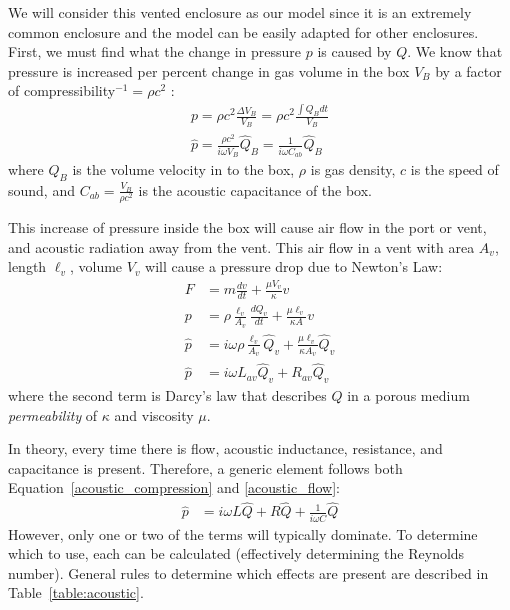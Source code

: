 \documentclass[10pt,letterpaper]{article}
\begin{document}
We will consider this vented enclosure as our model since it is an extremely common enclosure  and the model can be easily adapted for other enclosures. First, we must find what the change in pressure $p$ is caused by $Q$. We know that pressure is increased per percent change in gas volume in the box $V_B$ by a factor of compressibility$^{-1}=\rho c^2$ :
\begin{align}
p=\rho c^2 \frac{\Delta V_B}{V_B}=\rho c^2 \frac{\int Q_B dt}{V_B}\\
\hat{p}=\frac{\rho c^2}{i\omega V_B}\hat{Q}_B=\frac{1}{i\omega C_{ab}}\hat{Q}_B\label{acoustic_compression}
\end{align}
where $Q_B$ is the volume velocity in to the box, $\rho$ is gas density, $c$ is the speed of sound, and $C_{ab}=\frac{V_B}{\rho c^2}$ is the acoustic capacitance of the box.

This increase of pressure inside the box will cause air flow in 
the port or vent, and acoustic radiation away from the vent. This air flow in a vent with area $A_v$, length $\ell_v$, volume $V_v$ will cause a pressure drop due to Newton's Law:
\begin{align}
F&=m\frac{dv}{dt}+\frac{\mu V_v}{\kappa} v\\
p&=\rho \frac{\ell_v}{A_v}\frac{dQ_v}{dt}+\frac{\mu \ell_v}{\kappa A} v\\
\hat{p}&=i\omega\rho \frac{\ell_v}{A_v}\hat{Q}_v+\frac{\mu \ell_v}{\kappa A_v} \hat{Q}_v\\
\hat{p}&=i\omega L_{av} \hat{Q}_v+R_{av} \hat{Q}_v \label{acoustic_flow}
\end{align}
where the second term is Darcy's law that describes $Q$ in a porous medium \textit{permeability} of $\kappa$ and viscosity $\mu$.

In theory, every time there is flow, acoustic inductance, resistance, and capacitance is present. Therefore, a generic element follows both Equation~\ref{acoustic_compression} and \ref{acoustic_flow}:
\begin{align}
\hat{p}&=i\omega L \hat{Q}+R \hat{Q} +\frac{1}{i\omega C}\hat{Q}
\end{align}
However, only one or two of the terms will typically dominate. To determine which to use, each can be calculated (effectively determining the Reynolds number). General rules to determine which effects are present are described in Table~\ref{table:acoustic}.
\end{document}
